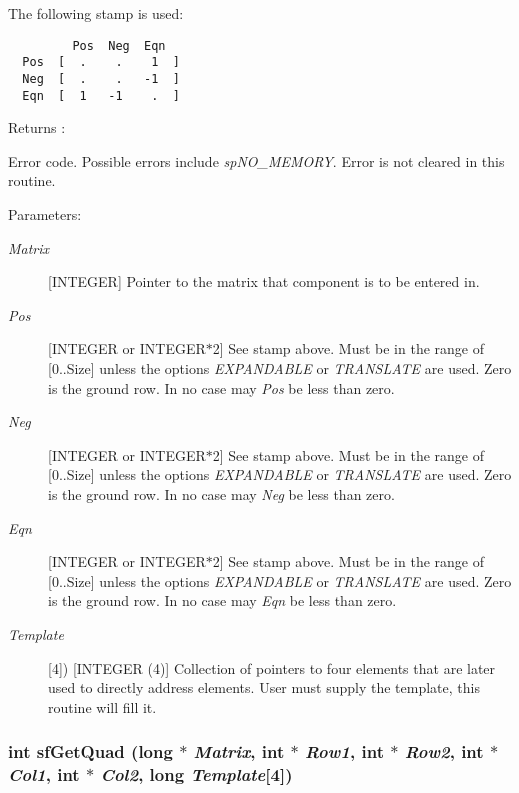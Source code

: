 The following stamp is used: 

\footnotesize\begin{verbatim}         Pos  Neg  Eqn
  Pos  [  .    .    1  ]
  Neg  [  .    .   -1  ]
  Eqn  [  1   -1    .  ]
\end{verbatim}\normalsize 


\begin{Desc}
\item[Returns :]\par
[INTEGER or INTEGER$\ast$2] Error code. Possible errors include {\em sp\-NO\_\-MEMORY}. Error is not cleared in this routine.\end{Desc}
\begin{Desc}
\item[Parameters: ]\par
\begin{description}
\item[{\em 
Matrix}][INTEGER] Pointer to the matrix that component is to be entered in. \item[{\em 
Pos}][INTEGER or INTEGER$\ast$2] See stamp above. Must be in the range of [0..Size] unless the options {\em EXPANDABLE} or {\em TRANSLATE} are used. Zero is the ground row. In no case may {\em Pos} be less than zero. \item[{\em 
Neg}][INTEGER or INTEGER$\ast$2] See stamp above. Must be in the range of [0..Size] unless the options {\em EXPANDABLE} or {\em TRANSLATE} are used. Zero is the ground row. In no case may {\em Neg} be less than zero. \item[{\em 
Eqn}][INTEGER or INTEGER$\ast$2] See stamp above. Must be in the range of [0..Size] unless the options {\em EXPANDABLE} or {\em TRANSLATE} are used. Zero is the ground row. In no case may {\em Eqn} be less than zero. \item[{\em 
Template}][4]) [INTEGER (4)] Collection of pointers to four elements that are later used to directly address elements. User must supply the template, this routine will fill it. \end{description}
\end{Desc}
\subsubsection{\setlength{\rightskip}{0pt plus 5cm}int sf\-Get\-Quad (long $\ast$ {\em Matrix}, int $\ast$ {\em Row1}, int $\ast$ {\em Row2}, int $\ast$ {\em Col1}, int $\ast$ {\em Col2}, long {\em Template}[4])}\label{spFortran_8c_a53}


